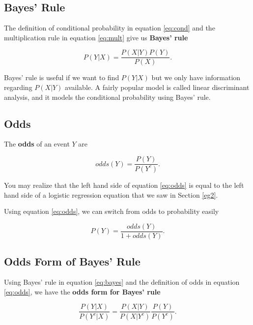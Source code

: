 \documentclass[
]{book}
\begin{document}
\subsection{Bayes' Rule}\label{bayes-rule}

The definition of conditional probability in equation \eqref{eq:cond} and the multiplication rule in equation \eqref{eq:mult} give us \textbf{Bayes' rule}

\begin{equation} 
P(Y|X) = \frac{P(X|Y)P(Y)}{P(X)}.
\label{eq:bayes}
\end{equation}

Bayes' rule is useful if we want to find \(P(Y|X)\) but we only have information regarding \(P(X|Y)\) available. A fairly popular model is called linear discriminant analysis, and it models the conditional probability using Bayes' rule.

\subsection{Odds}\label{odds}

The \textbf{odds} of an event \(Y\) are

\begin{equation} 
odds(Y) = \frac{P(Y)}{P(Y^c)}.
\label{eq:odds}
\end{equation}

You may realize that the left hand side of equation \eqref{eq:odds} is equal to the left hand side of a logistic regression equation that we saw in Section \ref{eg2}.

Using equation \eqref{eq:odds}, we can switch from odds to probability easily

\begin{equation} 
P(Y) = \frac{odds(Y)}{1 + odds(Y)}.
\label{eq:odds2}
\end{equation}

\subsection{Odds Form of Bayes' Rule}\label{odds-form-of-bayes-rule}

Using Bayes' rule in equation \eqref{eq:bayes} and the definition of odds in equation \eqref{eq:odds}, we have the \textbf{odds form for Bayes' rule}

\begin{equation} 
\frac{P(Y|X)}{P(Y^c|X)} = \frac{P(X|Y)}{P(X|Y^c)} \frac{P(Y)}{P(Y^c)}. 
\label{eq:oddsbayes}
\end{equation}
\end{document}
